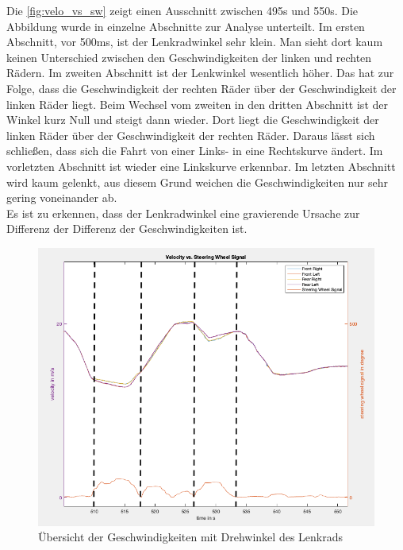 	Die \autoref{fig:velo_vs_sw} zeigt einen Ausschnitt zwischen 495s und 550s. Die Abbildung wurde in einzelne Abschnitte zur Analyse unterteilt. Im ersten Abschnitt, vor 500ms, ist der Lenkradwinkel sehr klein. Man sieht dort kaum keinen Unterschied zwischen den Geschwindigkeiten der linken und rechten Rädern. Im zweiten Abschnitt ist der Lenkwinkel wesentlich höher. Das hat zur Folge, dass die Geschwindigkeit der rechten Räder über der Geschwindigkeit der linken Räder liegt. Beim Wechsel vom zweiten in den dritten Abschnitt ist der Winkel kurz Null und steigt dann wieder. Dort liegt die Geschwindigkeit der linken Räder über der Geschwindigkeit der rechten Räder. Daraus lässt sich schließen, dass sich die Fahrt von einer Links- in eine Rechtskurve ändert. Im vorletzten Abschnitt ist wieder eine Linkskurve erkennbar. Im letzten Abschnitt wird kaum gelenkt, aus diesem Grund weichen die Geschwindigkeiten nur sehr gering voneinander ab.\\
Es ist zu erkennen, dass der Lenkradwinkel eine gravierende Ursache zur Differenz der Differenz der Geschwindigkeiten ist.
\begin{figure}[h!]
	\centering
	\includegraphics[width=1\linewidth]{../Graphiken/velo_vs_sw}
	\caption{Übersicht der Geschwindigkeiten mit Drehwinkel des Lenkrads}
	\label{fig:velo_vs_sw}
\end{figure}
